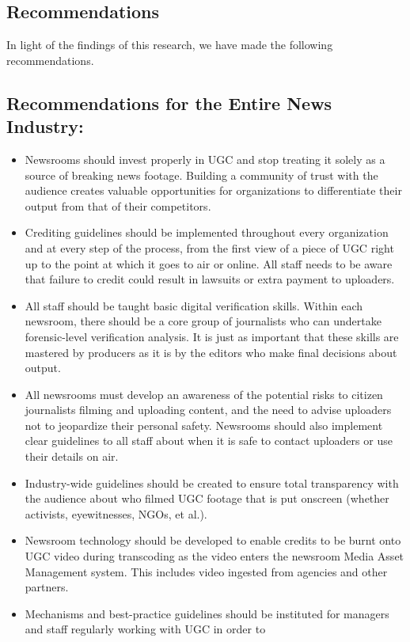 \begin{enumerate}
\chapter{Recommendations}
In light of the findings of this research, we have made the
following recommendations.
\section{Recommendations for the Entire News Industry:}
\begin{itemize}
\item Newsrooms should invest properly in UGC and stop treating
it solely as a source of breaking news footage. Building a
community of trust with the audience creates valuable opportunities
for organizations to differentiate their output from that
of their competitors.
\item Crediting guidelines should be implemented throughout every
organization and at every step of the process, from the first view
of a piece of UGC right up to the point at which it goes to air
or online. All staff needs to be aware that failure to credit could
result in lawsuits or extra payment to uploaders.
\item All staff should be taught basic digital verification skills. Within
each newsroom, there should be a core group of journalists who
can undertake forensic-level verification analysis. It is just as
important that these skills are mastered by producers as it is by
the editors who make final decisions about output.
\item All newsrooms must develop an awareness of the potential risks
to citizen journalists filming and uploading content, and the need
to advise uploaders not to jeopardize their personal safety. Newsrooms
should also implement clear guidelines to all staff about
when it is safe to contact uploaders or use their details on air.
\item Industry-wide guidelines should be created to ensure total transparency
with the audience about who filmed UGC footage that is
put onscreen (whether activists, eyewitnesses, NGOs, et al.).
\item Newsroom technology should be developed to enable credits to
be burnt onto UGC video during transcoding as the video enters
the newsroom Media Asset Management system. This includes
video ingested from agencies and other partners.
\item Mechanisms and best-practice guidelines should be instituted
for managers and staff regularly working with UGC in order to

\end{itemize}
\end{enumerate}
